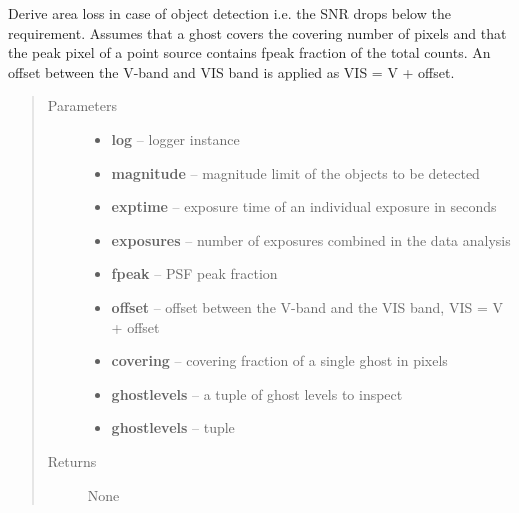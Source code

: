 \documentclass[a4paper,11pt,english]{sphinxmanual}
\begin{document}
\begin{fulllineitems}
\label{reduction:analysis.analyseGhosts.objectDetection}
Derive area loss in case of object detection i.e. the SNR drops below the requirement.
Assumes that a ghost covers the covering number of pixels and that the peak pixel of a
point source contains fpeak fraction of the total counts. An offset between the V-band
and VIS band is applied as VIS = V + offset.
\begin{quote}\begin{description}
\item[{Parameters}] \leavevmode\begin{itemize}
\item {} 
\textbf{log} -- logger instance

\item {} 
\textbf{magnitude} -- magnitude limit of the objects to be detected

\item {} 
\textbf{exptime} -- exposure time of an individual exposure in seconds

\item {} 
\textbf{exposures} -- number of exposures combined in the data analysis

\item {} 
\textbf{fpeak} -- PSF peak fraction

\item {} 
\textbf{offset} -- offset between the V-band and the VIS band, VIS = V + offset

\item {} 
\textbf{covering} -- covering fraction of a single ghost in pixels

\item {} 
\textbf{ghostlevels} -- a tuple of ghost levels to inspect

\item {} 
\textbf{ghostlevels} -- tuple

\end{itemize}

\item[{Returns}] \leavevmode
None

\end{description}\end{quote}

\end{fulllineitems}
\end{document}
